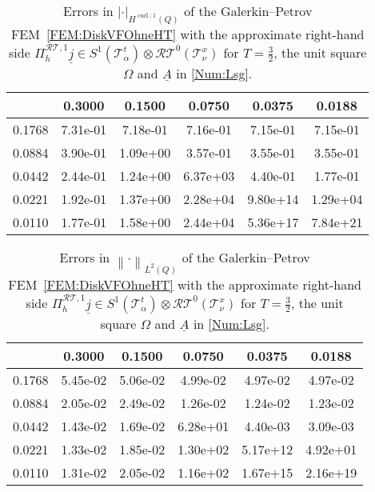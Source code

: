 \documentclass[a4paper,11pt]{article}
\newcommand{\cu}{\operatorname{curl}}
\renewcommand{\vec}[1]{\underline{#1}}
\newcommand{\abs}[1]{\left\lvert{#1}\right\rvert}
\newcommand{\norm}[1]{{\left\lVert{#1}\right\rVert}}
\begin{document}
\begin{table}[ht!]
	\begin{center}
		\begin{footnotesize}\begin{tabular}{r||c|c|c|c|c}
				\diagbox{$h_x$}{\vspace*{-.1cm}$h_t$} & 0.3000 & 0.1500 & 0.0750 & 0.0375 & 0.0188   \\
				\hline\hline
				0.1768 & 7.31e-01 & 7.18e-01 & 7.16e-01 & 7.15e-01 & 7.15e-01 \\
				0.0884 & 3.90e-01 & 1.09e+00 & 3.57e-01 & 3.55e-01 & 3.55e-01 \\
				0.0442 & 2.44e-01 & 1.24e+00 & 6.37e+03 & 4.40e-01 & 1.77e-01 \\
				0.0221 & 1.92e-01 & 1.37e+00 & 2.28e+04 & 9.80e+14 & 1.29e+04 \\
				0.0110 & 1.77e-01 & 1.58e+00 & 2.44e+04 & 5.36e+17 & 7.84e+21
		\end{tabular}\end{footnotesize}
		\caption{Errors in $\abs{\cdot}_{H^{\cu;1}(Q)}$ of the Galerkin--Petrov FEM~\eqref{FEM:DiskVFOhneHT} with the approximate right-hand side $\Pi_h^{\mathcal{RT},1} \vec j \in S^1(\mathcal T^t_\alpha) \otimes \mathcal{RT}^0(\mathcal T^x_\nu)$ for $T=\frac 3 2$, the unit square $\Omega$ and $\vec A$ in \eqref{Num:Lsg}.} \label{Num:Tab:OhneT32RTH1Curl}
	\end{center}
\end{table}

\begin{table}[ht!]
	\begin{center}
		\begin{footnotesize}\begin{tabular}{r||c|c|c|c|c}
				\diagbox{$h_x$}{\vspace*{-.1cm}$h_t$} & 0.3000 & 0.1500 & 0.0750 & 0.0375 & 0.0188  \\
				\hline\hline
				0.1768 & 5.45e-02 & 5.06e-02 & 4.99e-02 & 4.97e-02 & 4.97e-02 \\
				0.0884 & 2.05e-02 & 2.49e-02 & 1.26e-02 & 1.24e-02 & 1.23e-02 \\
				0.0442 & 1.43e-02 & 1.69e-02 & 6.28e+01 & 4.40e-03 & 3.09e-03 \\
				0.0221 & 1.33e-02 & 1.85e-02 & 1.30e+02 & 5.17e+12 & 4.92e+01 \\
				0.0110 & 1.31e-02 & 2.05e-02 & 1.16e+02 & 1.67e+15 & 2.16e+19
		\end{tabular}\end{footnotesize}
		\caption{Errors in $\norm{\cdot}_{L^2(Q)}$ of the Galerkin--Petrov FEM~\eqref{FEM:DiskVFOhneHT} with the approximate right-hand side $\Pi_h^{\mathcal{RT},1} \vec j \in S^1(\mathcal T^t_\alpha) \otimes \mathcal{RT}^0(\mathcal T^x_\nu)$ for $T=\frac 3 2$, the unit square $\Omega$ and $\vec A$ in \eqref{Num:Lsg}.} \label{Num:Tab:OhneT32RTL2}
	\end{center}
\end{table}
\end{document}
